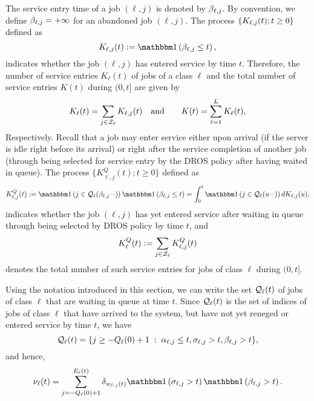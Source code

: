 \documentclass{article}
\theoremstyle{definition}
\numberwithin{equation}{section}
\begin{document}
The service entry time of a job $(\ell,j)$ is denoted by $\beta_{\ell,j}$. By convention, we define $\beta_{\ell,j}=+\infty$ for an abandoned job $(\ell,j)$. The process $\{K_{\ell,j}(t);t\geq0\}$ defined as
\[
\entry_{\ell,j}(t):= \indic{\entrytime_{\ell,j}\leq t},
\]
indicates whether the job $(\ell,j)$ has entered service by time $t$. Therefore, the number of service entries $K_\ell(t)$ of jobs of a class $\ell$ and the total number of service entries $K(t)$ during $(0,t]$ are given by
\begin{equation}\label{def_Klj}
  K_\ell(t) = \sum_{j\in\mathcal{Z}_\ell} K_{\ell,j}(t)\quad\text{and}\quad\quad K(t)=\sum_{\ell=1}^{L}K_{\ell}(t),
\end{equation}
Respectively.  Recall that a job may enter service either upon arrival (if the server is idle right before its arrival) or right after the service completion of another job (through being selected for service entry by the DROS policy after having waited in queue). The process $\{K^Q_{\ell,j}(t);t\geq0\}$ defined as
\begin{equation*}
\entry^{Q}_{\ell,j}(t):= \indic{j\in\inque_\ell(\entrytime_{\ell,j}-)}\indic{\entrytime_{\ell,j}\leq t} = \int_0^t \indic{j\in\inque_\ell(u-)}d\entry_{\ell,j}(u),
\end{equation*}
indicates whether the job $(\ell,j)$ has yet entered service after waiting in queue through being selected by DROS policy by time $t$, and 
\begin{equation}\label{def_KQ}
K^Q_{\ell}(t):=\sum_{j\in\mathcal{Z}_\ell} K^Q_{\ell,j}(t)
\end{equation}
denotes the total number of such service entries for jobs of class $\ell$ during $(0,t]$. %

Using the notation introduced in this section, we can write the set $\mathcal{Q}_\ell(t)$ of jobs of class $\ell$ that are waiting in queue at time $t$. Since $\mathcal{Q}_\ell(t)$ is the set of indices of jobs of class $\ell$ that have arrived to the system, but have not yet reneged or entered service by time $t$, we have
\[
\mathcal{Q}_\ell(t)= \{j\geq -Q_\ell(0)+1 \; : \; \alpha_{\ell,j}\leq t,\sigma_{\ell,j}>t , \beta_{\ell,j}>t\},
\]
and hence,
\begin{equation}\label{def_nu_alt}
\nu_\ell(t) = \sum_{j=-Q_\ell(0)+1}^{\arrival_\ell(t)}\delta_{\waiting_{\ell,j}(t)}\indic{\renegtime_{\ell,j}>t}\indic{\entrytime_{\ell,j}>t}.
\end{equation}
\end{document}
